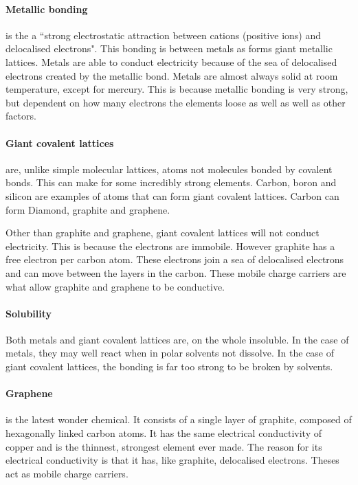 \documentclass[11pt,a4paper]{memoir}
\begin{document}
	\paragraph{Metallic bonding} is the a ``strong electrostatic attraction between cations (positive ions) and delocalised electrons". This bonding is between metals as forms giant metallic lattices. Metals are able to conduct electricity because of the sea of delocalised electrons created by the metallic bond. Metals are almost always solid at room temperature, except for mercury. This is because metallic bonding is very strong, but dependent on how many electrons the elements loose as well as well as other factors.
	
	\paragraph{Giant covalent lattices} are, unlike simple molecular lattices, atoms not molecules bonded by covalent bonds. This can make for some incredibly strong elements. Carbon, boron and silicon are examples of atoms that can form giant covalent lattices. Carbon can form Diamond, graphite and graphene.
	
	Other than graphite and graphene, giant covalent lattices will not conduct electricity. This is because the electrons are immobile. However graphite has a free electron per carbon atom. These electrons join a sea of delocalised electrons and can move between the layers in the carbon. These mobile charge carriers are what allow graphite and graphene to be conductive.
	
	\paragraph{Solubility} Both metals and giant covalent lattices are, on the whole insoluble. In the case of metals, they may well react when in polar solvents not dissolve. In the case of giant covalent lattices, the bonding is far too strong to be broken by solvents.
	
	\paragraph{Graphene} is the latest wonder chemical. It consists of a single layer of graphite, composed of hexagonally linked carbon atoms. It has the same electrical conductivity of copper and is the thinnest, strongest element ever made. The reason for its electrical conductivity is that it has, like graphite, delocalised electrons. Theses act as mobile charge carriers.
	
\end{document}
